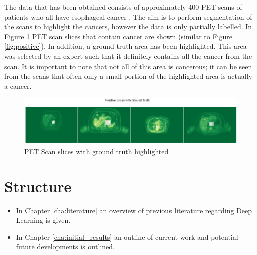 The data that has been obtained consists of approximately 400 PET scans of patients who all have esophageal cancer \cite{Enzinger_Mayer_2003}.
The aim is to perform segmentation of the scans to highlight the cancers, however the data is only partially labelled.
In Figure \ref{fig:ground_truth} PET scan slices that contain cancer are shown (similar to Figure \ref{fig:positive}).
In addition, a ground truth area has been highlighted.
This area was selected by an expert such that it definitely contains all the cancer from the scan.
It is important to note that not all of this area is cancerous; it can be seen from the scans that often only a small portion of the highlighted area is actually a cancer.

\begin{figure}[hbtp!]
    \centering
    \includegraphics[width=\textwidth]{./img/ground_truth.png}
    \caption{PET Scan slices with ground truth highlighted}
    \label{fig:ground_truth}
\end{figure}



\section{Structure}\label{sec:structure}

\begin{itemize}
    \item In Chapter \ref{cha:literature} an overview of previous literature regarding Deep Learning is given.
    \item In Chapter \ref{cha:initial_results} an outline of current work and potential future developments is outlined.
\end{itemize}